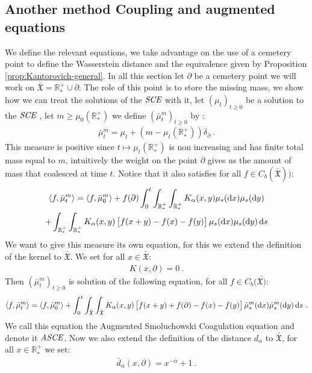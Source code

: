 \documentclass[11pt,a4paper]{article}
\newcommand{\RRP}{\mathbb{R}^+_*}
\newcommand{\XF}{\mathfrak{X}}
\newcommand{\SCE}{\emph{SCE}}
\newcommand{\ASCE}{{\emph{ASCE}}}
\newcommand{\Proc}[1]{\left(#1\right)_{t\geq 0}}
\newcommand{\brac}[1]{\left\langle#1\right\rangle}
\newcommand{\dd}{\mathop{}\!\mathrm{d}}
\begin{document}
\subsection{Another method Coupling and augmented equations}
We define the relevant equations, we take advantage on the use of a cemetery point to define the Wasserstein distance and the equivalence given by Proposition \ref{prop:Kantorovich-general}. In all this section let $\partial$ be a cemetery point we will work on $\bar{\XF} = \RRP \cup {\partial}$. The role of this point is to store the missing mass, we show how we can treat the solutions of the $\SCE$ with it, let $\Proc{\mu_t}$ be a solution to the $\SCE$ , let $m \geq \mu_0(\RRP)$ we define $\Proc{\bar{\mu}^m_t}$ by :
\begin{align*}
    \bar{\mu}^m_t = \mu_t + \left(m - \mu_t(\RRP) \right)\delta_\partial\ .
\end{align*}
This measure is positive since $t \mapsto \mu_t(\RRP)$ is non increasing and has finite total mass equal to $m$, intuitively the weight on the point $\partial$ gives us the amount of mass that coalesced at time $t$. Notice that it also satisfies for all $f \in C_b(\bar{\XF}))$:
\begin{multline*}
    \brac{f,\bar{\mu}^m_t} = \brac{f,\bar{\mu}^m_0} + f(\partial) \int_0^t\int_{\RRP} \int_{\RRP} K_\alpha(x,y)\mu_s(\dd x) \mu_s(\dd y) \\
    + \int_{\RRP} \int_{\RRP} K_\alpha(x,y) \left[\vphantom{A^2}f(x+y)  -f(x) -f(y)\right]\mu_s(\dd x) \mu_s(\dd y) \dd s
\end{multline*}
We want to give this measure its own equation, for this we extend the definition of the kernel to $\bar{\XF}$. We set for all $x \in \bar{\XF}$:
\begin{align*}
    K(x,\partial) = 0\ .
\end{align*}
Then $\Proc{\bar{\mu}^m_t}$ is solution of the following equation, for all $f \in C_b(\bar{\XF)}$:
\begin{align*}
    \brac{f,\bar{\mu}^m_t} = \brac{f,\bar{\mu}^m_0} + \int_0^t \int_{\bar{\XF}} \int_{\bar{\XF}} K_\alpha(x,y) \left[\vphantom{A^2}f(x+y) + f(\partial) -f(x) -f(y)\right]\bar{\mu}^m_s(\dd x) \bar{\mu}^m_s(\dd y) \dd s\ .
\end{align*}
We call this equation the Augmented Smoluchowski Coagulation equation and denote it $\ASCE$. Now we also extend the definition of the distance $d_\alpha$ to $\bar{\XF}$, for all $x \in \RRP$ we set:
\begin{align*}
    \bar{d}_\alpha(x,\partial) = x^{-\alpha} + 1\ .
\end{align*}
\end{document}
